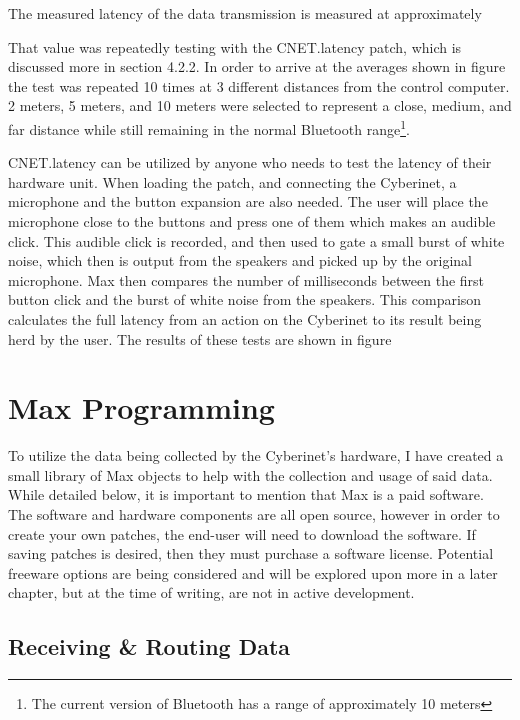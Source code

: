 
The measured latency of the data transmission is measured at approximately %

That value was repeatedly testing with the CNET.latency patch, which is discussed more in section 4.2.2. In order to arrive at the averages shown in figure %
the test was repeated 10 times at 3 different distances from the control computer. 2 meters, 5 meters, and 10 meters were selected to represent a close, medium, and far distance while still remaining in the normal Bluetooth range\footnote{The current version of Bluetooth has a range of approximately 10 meters}.

CNET.latency can be utilized by anyone who needs to test the latency of their hardware unit. When loading the patch, and connecting the Cyberinet, a microphone and the button expansion are also needed. The user will place the microphone close to the buttons and press one of them which makes an audible click. This audible click is recorded, and then used to gate a small burst of white noise, which then is output from the speakers and picked up by the original microphone. Max then compares the number of milliseconds between the first button click and the burst of white noise from the speakers. This comparison calculates the full latency from an action on the Cyberinet to its result being herd by the user. The results of these tests are shown in figure  

\section{Max Programming}

To utilize the data being collected by the Cyberinet’s hardware, I have created a small library of Max objects to help with the collection and usage of said data. While detailed below, it is important to mention that Max is a paid software. The software and hardware components are all open source, however in order to create your own patches, the end-user will need to download the software. If saving patches is desired, then they must purchase a software license. Potential freeware options are being considered and will be explored upon more in a later chapter, but at the time of writing, are not in active development.

\subsection{Receiving \& Routing Data}

